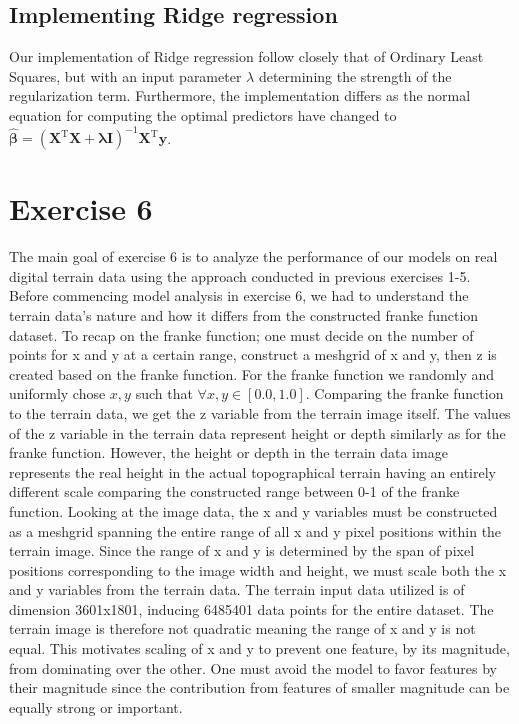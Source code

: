\documentclass[11pt, a4paper]{article}
\begin{document}
\subsection*{Implementing Ridge regression}
Our implementation of Ridge regression follow closely that of Ordinary Least Squares, but with an input parameter $\lambda$ determining the strength of the regularization term. Furthermore, the implementation differs as the normal equation for computing the optimal predictors have changed to $\bm{\hat{\beta}} = \left(\bm{X}^\text{T}\bm{X} + \bm{\lambda}\bm{I}\right)^{-1}\bm{X}^\text{T}\bm{y}$. 

\section*{Exercise 6}
The main goal of exercise 6 is to analyze the performance of our models on real digital terrain data using the approach conducted in previous exercises 1-5. Before commencing model analysis in exercise 6, we had to understand the terrain data's nature and how it differs from the constructed franke function dataset. 
To recap on the franke function; one must decide on the number of points for x and y at a certain range, construct a meshgrid of x and y, then z is created based on the franke function. For the franke function we randomly and uniformly chose $x,y$ such that $\forall x,y  \in{[0.0,1.0]}$.
Comparing the franke function to the terrain data, we get the z variable from the terrain image itself. The values of the z variable in the terrain data represent height or depth similarly as for the franke function. However, the height or depth in the terrain data image represents
the real height in the actual topographical terrain having an entirely different scale comparing the constructed range between 0-1 of the franke function. Looking at the image data, the x and y variables must be constructed as a meshgrid spanning the entire range of all x and y pixel positions within the terrain image. 
Since the range of x and y is determined by the span of pixel positions corresponding to the image width and height, we must scale both the x and y variables from the terrain data. The terrain input data utilized is of dimension 3601x1801, inducing 6485401 data points for the entire dataset. The terrain image is therefore not quadratic meaning the range of x and y is not equal. 
This motivates scaling of x and y to prevent one feature, by its magnitude, from dominating over the other. One must avoid the model to favor features by their magnitude since the contribution from features of smaller magnitude can be equally strong or important. 
\end{document}
